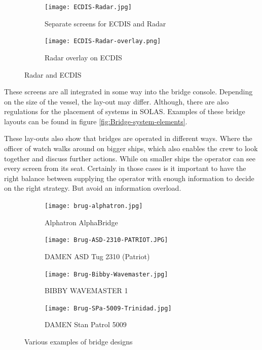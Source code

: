 \begin{figure}[p]
	\centering
	
	\begin{subfigure}[b]{0.6\textwidth}
		\texttt{[image: ECDIS-Radar.jpg]}
		\caption{Separate screens for ECDIS and Radar}
	\end{subfigure}
	\hfill
	\begin{subfigure}[b]{0.37\textwidth}
		\texttt{[image: ECDIS-Radar-overlay.png]}
		\caption{Radar overlay on ECDIS}
	\end{subfigure}
	
	\caption{Radar and ECDIS}
	\label{fig:ECDIS-example}
	
\end{figure}

These screens are all integrated in some way into the bridge console. Depending on the size of the vessel, the lay-out may differ. Although, there are also regulations for the placement of systems in \ac{SOLAS}. Examples of these bridge layouts can be found in figure \ref{fig:Bridge-system-elements}.

These lay-outs also show that bridges are operated in different ways. Where the officer of watch walks around on bigger ships, which also enables the crew to look together and discuss further actions. While on smaller ships the operator can see every screen from its seat. Certainly in those cases is it important to have the right balance between supplying the operator with enough information to decide on the right strategy. But avoid an information overload.

\begin{figure}[p]
	\centering
	
	\begin{subfigure}[b]{0.45\textwidth}
		\texttt{[image: brug-alphatron.jpg]}
		\caption{Alphatron AlphaBridge}
	\end{subfigure}
	\hfill
	\begin{subfigure}[b]{0.45\textwidth}
		\texttt{[image: Brug-ASD-2310-PATRIOT.JPG]}
		\caption{DAMEN ASD Tug 2310 (Patriot)}
	\end{subfigure}
	\hfill
	\begin{subfigure}[b]{0.45\textwidth}
		\texttt{[image: Brug-Bibby-Wavemaster.jpg]}
		\caption{BIBBY WAVEMASTER 1}
	\end{subfigure}
	\hfill
	\begin{subfigure}[b]{0.45\textwidth}
		\texttt{[image: Brug-SPa-5009-Trinidad.jpg]}
		\caption{DAMEN Stan Patrol 5009}
	\end{subfigure}	
	
	\caption{Various examples of bridge designs}
	\label{fig:bridge-example}
	
\end{figure}


